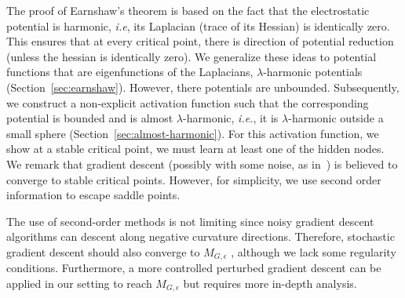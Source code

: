 
The proof of Earnshaw's theorem is based on the fact that the electrostatic potential is harmonic, \emph{i.e}, its Laplacian (trace of its Hessian) is identically zero. This ensures that at every critical point, there is direction of potential reduction (unless the hessian is identically zero). We generalize these ideas to potential functions that are eigenfunctions of the Laplacians, $\lambda$-harmonic potentials (Section~\ref{sec:earnshaw}). However, there potentials are unbounded. Subsequently, we construct a non-explicit activation function such that the corresponding potential is bounded and is almost $\lambda$-harmonic, \emph{i.e.}, it is $\lambda$-harmonic outside a small sphere (Section~\ref{sec:almost-harmonic}). For this activation function, we show at a stable critical point, we must learn at least one of the hidden nodes. We remark that gradient descent (possibly with some noise, as in~\cite{GeHJY15}) is believed to converge to stable critical points. However, for simplicity, we use second order information to escape saddle points.


{\color{red}The use of second-order methods is not limiting since noisy gradient descent algorithms can descent along negative curvature directions. Therefore, stochastic gradient descent should also converge to $M_{G,\epsilon}$ \cite{GeHJY15}, although we lack some regularity conditions. Furthermore, a more controlled perturbed gradient descent \cite{jin2017escape} can be applied in our setting to reach $M_{G,\epsilon}$ but requires more in-depth analysis.}


